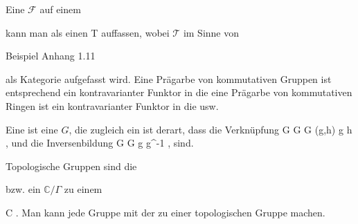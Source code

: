 {}
{





Eine
${ \mathcal F  }$ auf einem

 kann man als einen
 { {\mathcal T}} { 
} {}
auffassen, wobei $\mathcal T$ im Sinne von

Beispiel Anhang 1.11

als Kategorie aufgefasst wird. Eine Prägarbe von kommutativen Gruppen ist entsprechend ein kontravarianter Funktor in die
eine Prägarbe von kommutativen Ringen ist ein kontravarianter Funktor in die
usw.





}


{}
{





Eine
ist eine
$G$, die zugleich ein
ist derart, dass die Verknüpfung
\maabbeledisp {} {G \times G} {G
} {(g,h)} {g \circ h
} {,}
und die Inversenbildung
\maabbeledisp {} { G } { G
} { g } {g^{-1}
} {,}
sind.





}

Topologische Gruppen sind
\mathl{(\R,+)}{,}
 die

 bzw.
 ein
${\mathbb C}/\Gamma$ zu einem

\mavergleichskette
{\vergleichskette
{ \Gamma
}
{ \subseteq }{ {\mathbb C}
}
{  }{
}
{    }{
}
{   }{
}
}
{}{}{.}
Man kann jede Gruppe mit der
zu einer topologischen Gruppe machen.

